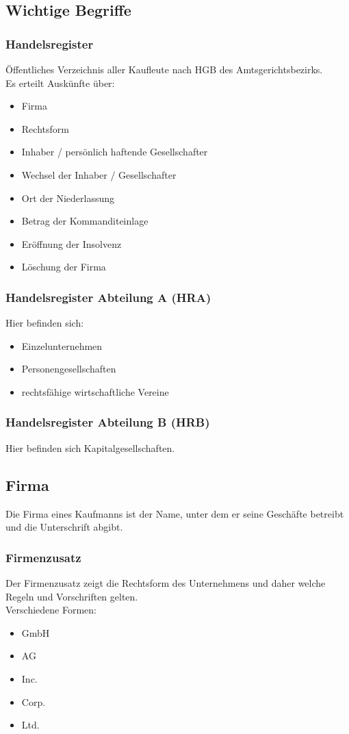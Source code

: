 \documentclass[asp1.tex]{subfiles}
\begin{document}
\subsection{Wichtige Begriffe}
\subsubsection{Handelsregister}
Öffentliches Verzeichnis aller Kaufleute nach HGB des Amtsgerichtsbezirks. \\
Es erteilt Auskünfte über:
\begin{itemize}
    \item Firma
    \item Rechtsform
    \item Inhaber / persönlich haftende Gesellschafter
    \item Wechsel der Inhaber / Gesellschafter
    \item Ort der Niederlassung
    \item Betrag der Kommanditeinlage
    \item Eröffnung der Insolvenz
    \item Löschung der Firma
\end{itemize}

\subsubsection{Handelsregister Abteilung A (HRA)}
Hier befinden sich:
\begin{itemize}
    \item Einzelunternehmen
    \item Personengesellschaften
    \item  rechtsfähige wirtschaftliche Vereine
\end{itemize}

\subsubsection{Handelsregister Abteilung B (HRB)}
Hier befinden sich  Kapitalgesellschaften.

\subsection{Firma}
Die Firma eines Kaufmanns ist der Name, unter dem er seine Geschäfte betreibt und die Unterschrift abgibt.

\subsubsection{Firmenzusatz}
Der Firmenzusatz zeigt die Rechtsform des Unternehmens und daher welche Regeln und Vorschriften gelten. \\
Verschiedene Formen:
\begin{itemize}
    \item GmbH
    \item AG
    \item Inc.
    \item Corp.
    \item Ltd.
\end{itemize}
\end{document}
